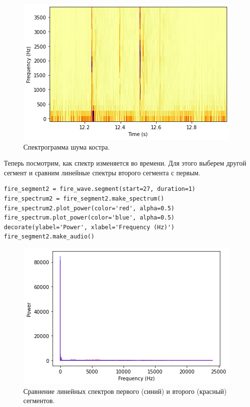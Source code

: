 \documentclass[a4paper, 14pt]{extarticle}
\begin{document}
    \begin{figure}[h]
        \centering
        \includegraphics[width=0.7\linewidth]{resources/Images/task1_fire_spectrogram}
        \caption{Спектрограмма шума костра.}
        \label{fig:task1_fire_spectrogram}
    \end{figure}

    Теперь посмотрим, как спектр изменяется во времени. Для этого выберем другой сегмент и сравним линейные спектры второго
    сегмента с первым.

    \begin{lstlisting}[caption= Сравнение линейных спектров двух сегментов., label={lst:task1_fire_spectrum_lin_compare}]
fire_segment2 = fire_wave.segment(start=27, duration=1)
fire_spectrum2 = fire_segment2.make_spectrum()
fire_spectrum2.plot_power(color='red', alpha=0.5)
fire_spectrum.plot_power(color='blue', alpha=0.5)
decorate(ylabel='Power', xlabel='Frequency (Hz)')
fire_segment2.make_audio()
    \end{lstlisting}

    \begin{figure}[h]
        \centering
        \includegraphics[width=0.8\linewidth]{resources/Images/task1_fire_spectrum_lin_compare}
        \caption{Сравнение линейных спектров первого (синий) и второго (красный) сегментов.}
        \label{fig:task1_fire_spectrum_lin_compare}
    \end{figure}
\end{document}
